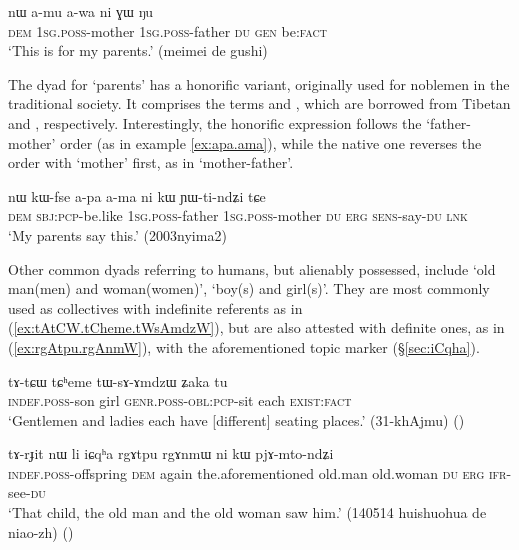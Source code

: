 \begin{exe}
\ex \label{ex:amu.awa.ni.GW}
 \gll nɯ a-mu a-wa ni ɣɯ ŋu \\
 \textsc{dem}  \textsc{1sg}.\textsc{poss}-mother \textsc{1sg}.\textsc{poss}-father \textsc{du} \textsc{gen} be:\textsc{fact} \\
 \glt `This is for my parents.' (meimei de gushi)
\end{exe}

The dyad for `parents' has a honorific variant, originally used for noblemen in the traditional society. It comprises the terms  and , which are borrowed from Tibetan   and , respectively. Interestingly, the honorific expression follows the `father-mother' order (as in example \ref{ex:apa.ama}), while the native one reverses the order with `mother' first, as in `mother-father'. 

\begin{exe}
\ex \label{ex:apa.ama}
 \gll nɯ kɯ-fse a-pa a-ma ni kɯ ɲɯ-ti-ndʑi tɕe \\
 \textsc{dem} \textsc{sbj}:\textsc{pcp}-be.like \textsc{1sg}.\textsc{poss}-father  \textsc{1sg}.\textsc{poss}-mother \textsc{du} \textsc{erg} \textsc{sens}-say-\textsc{du} \textsc{lnk} \\
 \glt `My parents say this.' (2003nyima2)
\end{exe}

Other common dyads referring to humans, but alienably possessed, include  `old man(men) and woman(women)',  `boy(s) and girl(s)'. They are most commonly used as collectives with indefinite referents as in (\ref{ex:tAtCW.tCheme.tWsAmdzW}), but are also attested with definite ones, as in (\ref{ex:rgAtpu.rgAnmW}), with the aforementioned topic marker  (§\ref{sec:iCqha}).
 
\begin{exe}
\ex \label{ex:tAtCW.tCheme.tWsAmdzW}
 \gll  tɤ-tɕɯ tɕʰeme tɯ-sɤ-ɤmdzɯ ʑaka tu \\
 \textsc{indef}.\textsc{poss}-son girl \textsc{genr}.\textsc{poss}-\textsc{obl}:\textsc{pcp}-sit each \textsc{exist}:\textsc{fact} \\
\glt `Gentlemen and ladies each have [different] seating places.' (31-khAjmu)
()
\end{exe}

\begin{exe}
\ex \label{ex:rgAtpu.rgAnmW}
 \gll tɤ-rɟit nɯ li iɕqʰa rgɤtpu rgɤnmɯ ni kɯ pjɤ-mto-ndʑi \\
 \textsc{indef}.\textsc{poss}-offspring \textsc{dem} again the.aforementioned  old.man old.woman \textsc{du} \textsc{erg} \textsc{ifr}-see-\textsc{du} \\
\glt `That child, the old man and the old woman saw him.' (140514 huishuohua de niao-zh)
()
\end{exe}

